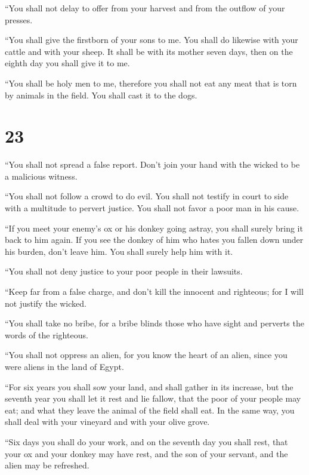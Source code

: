  ``You shall not delay to offer from your harvest and
from the outflow of your presses.

``You shall give the firstborn of your sons to me.  You
shall do likewise with your cattle and with your sheep. It shall be with
its mother seven days, then on the eighth day you shall give it to me.

 ``You shall be holy men to me, therefore you shall not
eat any meat that is torn by animals in the field. You shall cast it to
the dogs.

\hypertarget{section-22}{%
\section{23}\label{section-22}}

 ``You shall not spread a false report. Don't join your
hand with the wicked to be a malicious witness.

 ``You shall not follow a crowd to do evil. You shall not
testify in court to side with a multitude to pervert justice.
 You shall not favor a poor man in his cause.

 ``If you meet your enemy's ox or his donkey going astray,
you shall surely bring it back to him again.  If you see
the donkey of him who hates you fallen down under his burden, don't
leave him. You shall surely help him with it.

 ``You shall not deny justice to your poor people in their
lawsuits.

 ``Keep far from a false charge, and don't kill the
innocent and righteous; for I will not justify the wicked.

 ``You shall take no bribe, for a bribe blinds those who
have sight and perverts the words of the righteous.

 ``You shall not oppress an alien, for you know the heart
of an alien, since you were aliens in the land of Egypt.

 ``For six years you shall sow your land, and shall
gather in its increase,  but the seventh year you shall
let it rest and lie fallow, that the poor of your people may eat; and
what they leave the animal of the field shall eat. In the same way, you
shall deal with your vineyard and with your olive grove.

 ``Six days you shall do your work, and on the seventh
day you shall rest, that your ox and your donkey may have rest, and the
son of your servant, and the alien may be refreshed.

